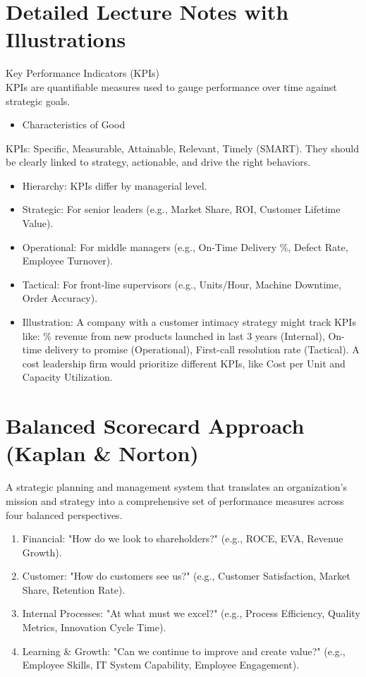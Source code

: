 \documentclass[10pt]{article}
\begin{document}
\section*{Detailed Lecture Notes with Illustrations}
Key Performance Indicators (KPIs)\\
KPIs are quantifiable measures used to gauge performance over time against strategic goals.

\begin{itemize}
  \item Characteristics of Good
\end{itemize}

KPIs: Specific, Measurable, Attainable, Relevant, Timely (SMART). They should be clearly linked to strategy, actionable, and drive the right behaviors.

\begin{itemize}
  \item Hierarchy: KPIs differ by managerial level.
  \item Strategic: For senior leaders (e.g., Market Share, ROI, Customer Lifetime Value).
  \item Operational: For middle managers (e.g., On-Time Delivery \%, Defect Rate, Employee Turnover).
  \item Tactical: For front-line supervisors (e.g., Units/Hour, Machine Downtime, Order Accuracy).
  \item Illustration: A company with a customer intimacy strategy might track KPIs like: \% revenue from new products launched in last 3 years (Internal), On-time delivery to promise (Operational), First-call resolution rate (Tactical). A cost leadership firm would prioritize different KPIs, like Cost per Unit and Capacity Utilization.
\end{itemize}

\section*{Balanced Scorecard Approach (Kaplan \& Norton)}
A strategic planning and management system that translates an organization's mission and strategy into a comprehensive set of performance measures across four balanced perspectives.

\begin{enumerate}
  \item Financial: "How do we look to shareholders?" (e.g., ROCE, EVA, Revenue Growth).
  \item Customer: "How do customers see us?" (e.g., Customer Satisfaction, Market Share, Retention Rate).
  \item Internal Processes: "At what must we excel?" (e.g., Process Efficiency, Quality Metrics, Innovation Cycle Time).
  \item Learning \& Growth: "Can we continue to improve and create value?" (e.g., Employee Skills, IT System Capability, Employee Engagement).
\end{enumerate}
\end{document}
